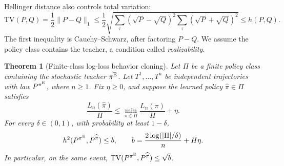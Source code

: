 \documentclass[11pt,twoside]{article}
\newcommand{\TV}{\mathrm{TV}}
\newtheorem{theorem}{Theorem}[section]
\theoremstyle{definition}
\theoremstyle{remark}
\begin{document}
Hellinger distance also controls total variation:
\begin{equation}
 \TV(P,Q)
 = \frac12 \|P-Q\|_1
 \le\frac12
 \sqrt{\sum_\tau(\sqrt P-\sqrt Q)^2
              \sum_\tau(\sqrt P+\sqrt Q)^2}
 \le h(P,Q).
 \label{eq:tv-hellinger}
\end{equation}
The first inequality is Cauchy--Schwarz, after factoring $P-Q$.
We assume the policy class contains the teacher, a condition called
\emph{realizability}.

\begin{theorem}[Finite-class log-loss behavior cloning]
\label{thm:bc}
Let $\Pi$ be a finite policy class containing the stochastic teacher
$\pi^{\rm E}$. Let $T^1,\ldots,T^n$ be independent trajectories with law
$P^{\pi^{\rm E}}$, where $n\ge1$. Fix $\eta\ge0$, and suppose the learned
policy $\widehat\pi\in\Pi$ satisfies
\begin{equation}
 \frac{L_n(\widehat\pi)}{H}
 \le \min_{\pi\in\Pi}\frac{L_n(\pi)}{H}+\eta.
 \label{eq:approx-mle}
\end{equation}
For every $\delta\in(0,1)$, with probability at least $1-\delta$,
\begin{equation}
 h^2(P^{\pi^{\rm E}},P^{\widehat\pi})\le b,
 \qquad b=\frac{2\log(|\Pi|/\delta)}n+H\eta.
 \label{eq:bc-bound}
\end{equation}
In particular, on the same event,
$\TV(P^{\pi^{\rm E}},P^{\widehat\pi})\le\sqrt b$.
\end{theorem}
\end{document}
